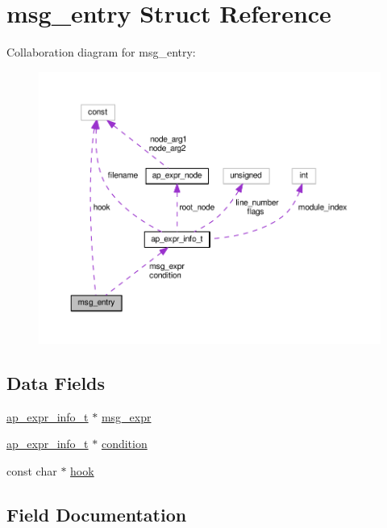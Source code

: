 \hypertarget{structmsg__entry}{}\section{msg\+\_\+entry Struct Reference}
\label{structmsg__entry}


Collaboration diagram for msg\+\_\+entry\+:
\nopagebreak
\begin{figure}[H]
\begin{center}
\leavevmode
\includegraphics[width=350pt]{structmsg__entry__coll__graph}
\end{center}
\end{figure}
\subsection*{Data Fields}
\begin{DoxyCompactItemize}
\item 
\hyperlink{structap__expr__info__t}{ap\+\_\+expr\+\_\+info\+\_\+t} $\ast$ \hyperlink{structmsg__entry_a2c758d8453a26fd0868c187b0c86afb0}{msg\+\_\+expr}
\item 
\hyperlink{structap__expr__info__t}{ap\+\_\+expr\+\_\+info\+\_\+t} $\ast$ \hyperlink{structmsg__entry_a6be3402daa9c35952625d8463e0ceefd}{condition}
\item 
const char $\ast$ \hyperlink{structmsg__entry_a83544ac08bfa92a6905b5f7cf0bea210}{hook}
\end{DoxyCompactItemize}


\subsection{Field Documentation}
